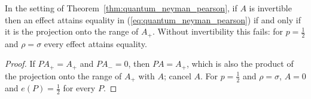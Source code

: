 \begin{corollary}
    \label{cor:quantum_neyman_pearson_kernel}
    \leanok
    In the setting of Theorem~\ref{thm:quantum_neyman_pearson}, if $A$ is
    invertible then an effect attains equality in
    (\ref{eq:quantum_neyman_pearson}) if and only if it is the projection onto
    the range of $A_+$. Without invertibility this fails: for $p=\tfrac12$ and
    $\rho=\sigma$ every effect attains equality.
\end{corollary}
\begin{proof}
    \leanok
    If $PA_+=A_+$ and $PA_-=0$, then $PA=A_+$, which is also the product of
    the projection onto the range of $A_+$ with $A$; cancel $A$. For $p=\tfrac12$
    and $\rho=\sigma$, $A=0$ and $e(P)=\tfrac12$ for every $P$.
\end{proof}

